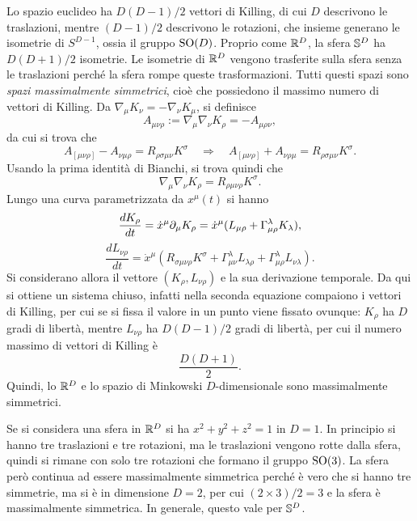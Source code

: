 Lo spazio euclideo ha $D(D - 1)/2$ vettori di Killing, di cui $D$ descrivono le traslazioni, mentre $(D - 1)/2$ descrivono le rotazioni, che insieme generano le isometrie di $S^{D - 1}$, ossia il gruppo $\mathrm{SO}(D)$. Proprio come $\mathbb{R}^D$, la sfera $\mathbb{S}^D$ ha $D(D + 1)/2$ isometrie. Le isometrie di $\mathbb{R}^D$ vengono trasferite sulla sfera senza le traslazioni perché la sfera rompe queste trasformazioni. Tutti questi spazi sono \emph{spazi massimalmente simmetrici}, cioè che possiedono il massimo numero di vettori di Killing. Da $\nabla_\mu K_\nu = -\nabla_\nu K_\mu$, si definisce 
\begin{equation}
    A_{\mu\nu\rho} := \nabla_\mu\nabla_\nu K_\rho = -A_{\mu\rho\nu},
\end{equation}
da cui si trova che 
\begin{equation}
    A_[\mu\nu\rho] - A_{\nu\mu\rho} = R_{\rho\sigma\mu\nu}K^\sigma \quad\Longrightarrow\quad A_[\mu\nu\rho] + A_{\nu\rho\mu} = R_{\rho\sigma\mu\nu}K^\sigma.
\end{equation}
Usando la prima identità di Bianchi, si trova quindi che 
\begin{equation}
    \nabla_\mu\nabla_\nu K_\rho = R_{\rho\mu\nu\rho}K^\sigma.
\end{equation}
Lungo una curva parametrizzata da $x^\mu(t)$ si hanno
\begin{equation}
    \frac{dK_\rho}{dt} = \dot{x}^\mu\partial_\mu K_\rho = \dot{x}^\mu(L_{\mu\rho} + \Gamma^\lambda_{\mu\rho}K_\lambda),
\end{equation}
\begin{equation}
    \frac{dL_{\nu\rho}}{dt} = \dot{x}^\mu(R_{\sigma\mu\nu\rho}K^\sigma + \Gamma_{\mu\nu}^\lambda L_{\lambda\rho} + \Gamma^\lambda_{\mu\rho}L_{\nu\lambda}).
\end{equation}
Si considerano allora il vettore $(K_\rho,L_{\nu\rho})$ e la sua derivazione temporale. Da qui si ottiene un sistema chiuso, infatti nella seconda equazione compaiono i vettori di Killing, per cui se si fissa il valore in un punto viene fissato ovunque: $K_\rho$ ha $D$ gradi di libertà, mentre $L_{\nu\rho}$ ha $D(D - 1)/2$ gradi di libertà, per cui il numero massimo di vettori di Killing è 
\begin{equation}
    \frac{D(D + 1)}{2}.
\end{equation}
Quindi, lo $\mathbb{R}^D$ e lo spazio di Minkowski $D$-dimensionale sono massimalmente simmetrici.

Se si considera una sfera in $\mathbb{R}^D$ si ha $x^2 + y^2 + z^2 = 1$ in $D = 1$. In principio si hanno tre traslazioni e tre rotazioni, ma le traslazioni vengono rotte dalla sfera, quindi si rimane con solo tre rotazioni che formano il gruppo $\mathrm{SO}(3)$. La sfera però continua ad essere massimalmente simmetrica perché è vero che si hanno tre simmetrie, ma si è in dimensione $D = 2$, per cui $(2 \times 3)/2 = 3$ e la sfera è massimalmente simmetrica. In generale, questo vale per $\mathbb{S}^D$. 

